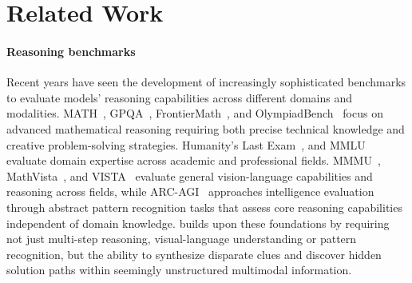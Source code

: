 \section{Related Work}
\paragraph{Reasoning benchmarks} 
Recent years have seen the development of increasingly sophisticated benchmarks to evaluate models' reasoning capabilities across different domains and modalities. 
MATH~\citep{hendrycks2021measuringmathematicalproblemsolving}, GPQA~\citep{rein2024gpqa}, FrontierMath~\citep{glazer2024frontiermathbenchmarkevaluatingadvanced}, and OlympiadBench~\citep{he2024olympiadbench} focus on advanced mathematical reasoning requiring both precise technical knowledge and creative problem-solving strategies. 
Humanity's Last Exam~\citep{phan2025humanitysexam}, and MMLU~\citep{hendrycks2021measuringmassivemultitasklanguage} evaluate domain expertise across academic and professional fields. 
MMMU~\citep{yue2023mmmu}, MathVista~\citep{lu2024mathvista}, and VISTA~\citep{menghini2024vistabench} evaluate general vision-language capabilities and reasoning across fields, while ARC-AGI~\citep{chollet2019measureintelligence} approaches intelligence evaluation through abstract pattern recognition tasks that assess core reasoning capabilities independent of domain knowledge. 
\enigmaeval builds upon these foundations by requiring not just multi-step reasoning, visual-language understanding or pattern recognition, but the ability to synthesize disparate clues and discover hidden solution paths within seemingly unstructured multimodal information.




